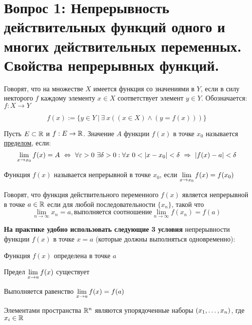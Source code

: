 \section{Вопрос 1: Непрерывность действительных функций одного и многих действительных переменных. Свойства непрерывных функций.}

\begin{defs}
Говорят, что на множестве $X$ имеется функция со значениями в $Y$, если в силу некторого $f$ каждому элементу $x \in X$ соответствует элемент $y \in Y$. Обозначается: $f: X \to Y$

$$f(x) := \{ y \in Y \ | \ \exists \ x ((x\in X) \wedge (y = f(x))) \} $$
\end{defs}


\begin{defs}
	Пусть $E \subset \mathbb{R}$ и $f: E \to \mathbb{R}$. Значение $A$ функции $f(x)$ в точке $x_0$ называется \underline{пределом}, если:
	$$\lim_{x\to x_0} f(x) = A \ \Leftrightarrow \ \forall \varepsilon > 0 \ \exists \delta > 0: \forall x \ 0 < \left| x - x_0\right| < \delta \ \Rightarrow \ \left| f(x) - a\right| < \delta$$
\end{defs}

\begin{defs}
	Функция $f(x)$ называется непрерывной в точке $x_0$, если $\lim\limits_{x \to x_0}f(x) = f(x_0)$
\end{defs}

\begin{defs}
	Говорят, что функция действительного переменного $f(x)$ является непрерывной в точке $a \in \mathbb{R}$ если для любой последовательности $\{x_n\}$, такой что
	$$\lim_{n \to \infty}x_n = a, \text{выполняется соотношение} \lim_{n \to \infty}f(x_n) = f(a)$$
\end{defs}

\textbf{На практике удобно использовать следующие 3 условия} непрерывности функции $f(x)$ в точке $x = a$ (которые должны выполняться одновременно):
\begin{enumerate*}
	\item Функция $f(x)$ определена в точке $a$
	\item Предел $\lim\limits_{x \to a}f(x)$ существует
	\item Выполняется равенство $\lim\limits_{x \to a}f(x)= f(a)$
\end{enumerate*}

\begin{defs}
	Элементами пространства $\mathbb{R}^n$ являются упорядоченные наборы $\left(x_1,\ldots,x_n\right)$, где $x_i \in \mathbb{R}$
\end{defs}

